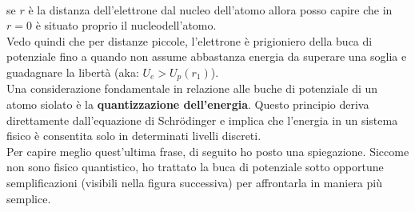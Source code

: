 %
\\
se $r$ è la distanza dell'elettrone dal nucleo dell'atomo allora posso capire che in $r=0$ è situato proprio il nucleodell'atomo.\\
Vedo quindi che per distanze piccole, l'elettrone è prigioniero della buca di potenziale fino a quando non assume abbastanza energia  da superare una soglia e guadagnare la libertà (aka: $U_e > U_{p}(r_1)$).\\
Una considerazione fondamentale in relazione alle buche di potenziale di un atomo siolato è la \textbf{quantizzazione dell'energia}. Questo principio deriva direttamente dall'equazione di Schrödinger e implica che l'energia in un sistema fisico è consentita solo in determinati livelli discreti. \\
Per capire meglio quest'ultima frase, di seguito ho posto una spiegazione. Siccome non sono fisico quantistico, ho trattato la buca di potenziale sotto opportune semplificazioni (visibili nella figura successiva) per affrontarla in maniera più semplice.
%

